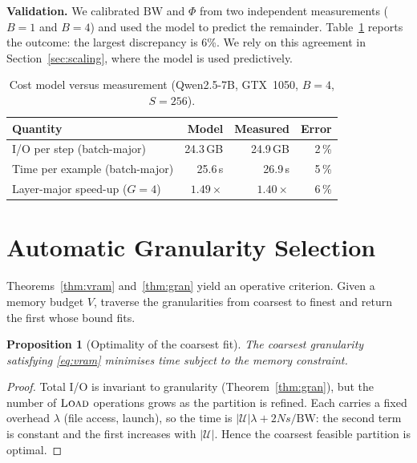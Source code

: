 \documentclass[preprint,12pt]{elsarticle}
\newtheorem{proposition}[theorem]{Proposition}
\begin{document}
\textbf{Validation.} We calibrated $\mathrm{BW}$ and $\Phi$ from two independent measurements
($B=1$ and $B=4$) and used the model to predict the remainder. Table~\ref{tab:cost} reports the outcome:
the largest discrepancy is 6\%. We rely on this agreement in Section~\ref{sec:scaling}, where the model is
used predictively.

\begin{table}[t]
\centering
\caption{Cost model versus measurement (Qwen2.5-7B, GTX~1050, $B=4$, $S=256$).}
\label{tab:cost}
\footnotesize
\begin{tabular}{@{}lrrr@{}}
\toprule
\textbf{Quantity} & \textbf{Model} & \textbf{Measured} & \textbf{Error} \\
\midrule
I/O per step (batch-major)      & 24.3\,GB & 24.9\,GB & 2\,\% \\
Time per example (batch-major)  & 25.6\,s  & 26.9\,s  & 5\,\% \\
Layer-major speed-up ($G{=}4$)  & $1.49\times$ & $1.40\times$ & 6\,\% \\
\bottomrule
\end{tabular}
\end{table}

\section{Automatic Granularity Selection}
\label{sec:auto}

Theorems~\ref{thm:vram} and~\ref{thm:gran} yield an operative criterion. Given a memory budget $V$, traverse the
granularities from coarsest to finest and return the first whose bound fits.

\begin{proposition}[Optimality of the coarsest fit]
\label{prop:auto}
The coarsest granularity satisfying \eqref{eq:vram} minimises time subject to the memory
constraint.
\end{proposition}

\begin{proof}
Total I/O is invariant to granularity (Theorem~\ref{thm:gran}), but the number of $\textsc{Load}$
operations grows as the partition is refined. Each carries a fixed overhead $\lambda$ (file access,
launch), so the time is $|\mathcal{U}|\lambda + 2Ns/\mathrm{BW}$: the second term is constant and
the first increases with $|\mathcal{U}|$. Hence the coarsest feasible partition is optimal.
\end{proof}
\end{document}
